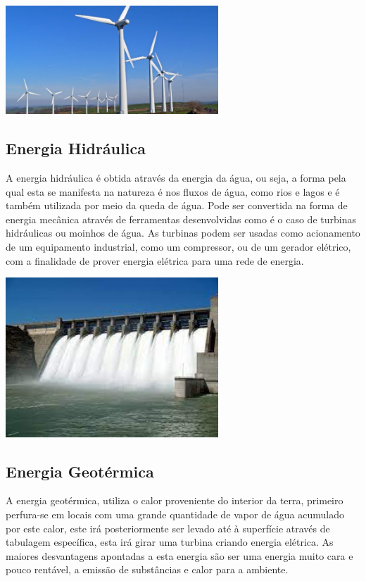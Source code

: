 \documentclass{report}
\begin{document}
\begin{center}
\includegraphics[width=8cm]{parque-eolico5.jpeg}
\end{center}

\subsection{Energia Hidráulica}
A energia hidráulica é obtida através da energia da água, ou seja, a forma pela qual esta se manifesta na natureza é nos fluxos de água, como rios e lagos e é também utilizada por meio da queda de água. Pode ser convertida na forma de energia mecânica através de ferramentas desenvolvidas como é o caso de turbinas hidráulicas ou moinhos de água. As turbinas podem ser usadas como acionamento de um equipamento industrial, como um compressor, ou de um gerador elétrico, com a finalidade de prover energia elétrica para uma rede de energia.


\begin{center}
\includegraphics[width=8cm]{energia hidrica.jpeg}
\end{center}


\subsection{Energia Geotérmica}
A energia geotérmica, utiliza o calor proveniente do interior da terra, primeiro perfura-se em locais com uma grande quantidade de vapor de água acumulado por este calor, este irá posteriormente ser levado até à superfície através de tabulagem específica, esta irá girar uma turbina criando energia elétrica. As maiores desvantagens apontadas a esta energia são ser uma energia muito cara e pouco rentável, a emissão de substâncias e calor para a ambiente.
\end{document}
